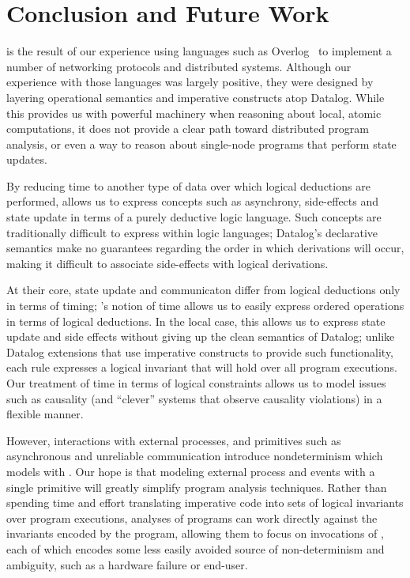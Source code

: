 \section{Conclusion and Future Work}
\lang is the result of our experience using languages such as
Overlog~\cite{Loo2009-CACM} to implement a number of networking protocols
and distributed systems.  Although our experience with those
languages was largely positive, they were designed by layering
operational semantics and imperative constructs atop Datalog.  While
this provides us with powerful machinery when reasoning about local,
atomic computations, it does not provide a clear
path toward distributed program analysis, or even a way to reason
about single-node programs that perform state updates.

By reducing time to another type of data over which logical deductions
are performed, \lang allows us to express concepts such as asynchrony,
side-effects and state update in terms of a purely deductive logic
language.  Such concepts are traditionally difficult to express within
logic languages; Datalog's declarative semantics make no guarantees
regarding the order in which derivations will occur, making it
difficult to associate side-effects with logical derivations.  

At their core, state update and communicaton differ from logical
deductions only in terms of timing; \lang's notion of time allows us
to easily express ordered operations in terms of logical deductions.
In the local case, this allows us to express state update and side
effects without giving up the clean semantics of Datalog; unlike
Datalog extensions that use imperative constructs to provide such
functionality, each \lang rule expresses a logical invariant that will
hold over all program executions.  Our treatment of time in terms of
logical constraints allows us to model issues such as causality (and
``clever'' systems that observe causality violations) in a flexible
manner.

However, interactions with external processes, and primitives such as
asynchronous and unreliable communication introduce nondeterminism
which \lang models with .  
Our hope is that modeling external process and events with a single
primitive will greatly simplify program analysis techniques.  Rather
than spending time and effort translating imperative code into sets of logical
invariants over program executions, analyses of \lang programs can
work directly against the invariants encoded by the program, allowing
them to focus on invocations of , each of which
encodes some less easily avoided source of non-determinism and
ambiguity, such as a hardware failure or end-user.

